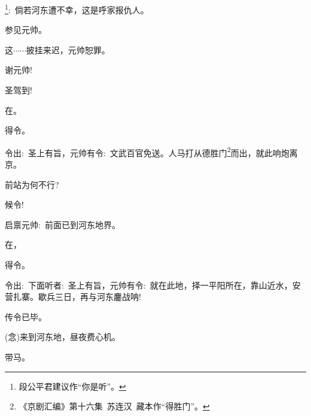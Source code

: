 {



\footnote{段公平{\scriptsize 君}建议作``你是听''。}{:~倘若河东遭不幸，这是呼家报仇人。}



\vspace{5pt}

{参见元帅。}

{这$\cdots{}\cdots{}$披挂来迟，元帅恕罪。}

{谢元帅!}

{圣驾到!}

{在。}

{得令。}

{令出:~圣上有旨，元帅有令:~文武百官免送。人马打从德胜门}\footnote{《京剧汇编》第十六集~苏连汉~藏本作``得胜门''。}{而出，就此响炮离京。}

{\vspace{5pt}}

{前站为何不行?}

{候令!}

{启禀元帅:~前面已到河东地界。}

{在，}

{得令。}

{令出:~下面听者:~圣上有旨，元帅有令:~就在此地，择一平阳所在，靠山近水，安营扎寨。歇兵三日，再与河东鏖战呐!}

{传令已毕。}

{\vspace{5pt}}

{({\akai 念})来到河东地，昼夜费心机。}

{带马。}

}
